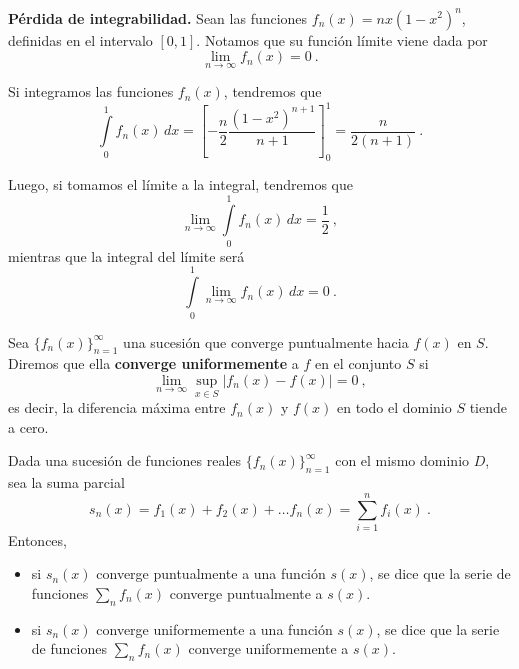 \begin{ejemplo}{\textbf{Pérdida de integrabilidad.}}
    Sean las funciones $f_n(x) = nx(1-x^2)^n$, definidas en el intervalo $[0,1]$. Notamos que su función límite viene dada por
    \begin{equation*}
        \lim_{n \to \infty} f_n(x) = 0 \ .
    \end{equation*}

    Si integramos las funciones $f_n(x)$, tendremos que 
    \begin{equation*}
        \int\limits_0^1 f_n(x) \, dx = \left[ - \frac{n}{2} \frac{(1-x^2)^{n+1}}{n+1} \right]_0^1 = \frac{n}{2(n+1)} \ .
    \end{equation*}

    Luego, si tomamos el límite a la integral, tendremos que 
    \begin{equation*}
        \lim_{n \to \infty} \int\limits_0^1 f_n(x) \, dx = \frac{1}{2} \ ,
    \end{equation*}
    mientras que la integral del límite será 
    \begin{equation*}
        \int\limits_0^1 \lim_{n \to \infty} f_n(x) \, dx = 0 \ .
    \end{equation*}
\end{ejemplo}

\begin{defi} 
    Sea $\{ f_n(x) \}_{n=1}^\infty$ una sucesión que converge puntualmente hacia $f(x)$ en $S$. Diremos que ella \textbf{converge uniformemente} a $f$ en el conjunto $S$ si 
    \begin{equation}
        \lim_{n \to \infty} \sup_{x \in S} |f_n(x) - f(x)| = 0 \ ,
    \end{equation} 
    es decir, la diferencia máxima entre $f_n(x)$ y $f(x)$ en todo el dominio $S$ tiende a cero.
\end{defi}

Dada una sucesión de funciones reales $\{ f_n(x) \}_{n=1}^\infty$ con el mismo dominio $D$, sea la suma parcial 
\begin{equation*}
    s_n(x) = f_1(x) + f_2(x) + \dots f_n(x) = \sum_{i=1}^n f_i(x) \ .
\end{equation*}
Entonces,
\begin{itemize}
    \item si $s_n(x)$ converge puntualmente a una función $s(x)$, se dice que la serie de funciones $\sum\limits_n f_n(x)$ converge puntualmente a $s(x)$.
    \item si $s_n(x)$ converge uniformemente a una función $s(x)$, se dice que la serie de funciones $\sum\limits_n f_n(x)$ converge uniformemente a $s(x)$.
\end{itemize}

